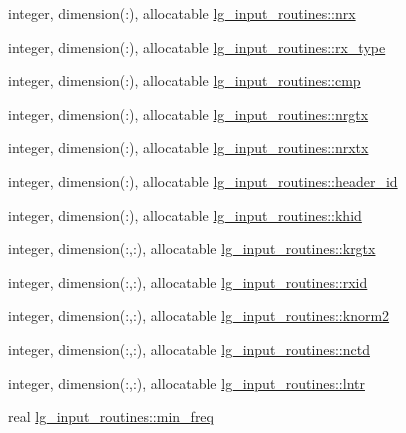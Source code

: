 \begin{DoxyCompactItemize}
\item 
integer, dimension(\+:), allocatable \hyperlink{namespacelg__input__routines_adf5b39741b7d138a3ecfb6657123a5ee}{lg\+\_\+input\+\_\+routines\+::nrx}
\item 
integer, dimension(\+:), allocatable \hyperlink{namespacelg__input__routines_afadcb9ad7dfccd7edb679d19fec0b5db}{lg\+\_\+input\+\_\+routines\+::rx\+\_\+type}
\item 
integer, dimension(\+:), allocatable \hyperlink{namespacelg__input__routines_ae700c1a68129dc3b61dd0eee2253b79f}{lg\+\_\+input\+\_\+routines\+::cmp}
\item 
integer, dimension(\+:), allocatable \hyperlink{namespacelg__input__routines_aa0b46c0970c520713d64c57e4ae00693}{lg\+\_\+input\+\_\+routines\+::nrgtx}
\item 
integer, dimension(\+:), allocatable \hyperlink{namespacelg__input__routines_a7b767c5d80ecdf07e162e0ca88f18f5a}{lg\+\_\+input\+\_\+routines\+::nrxtx}
\item 
integer, dimension(\+:), allocatable \hyperlink{namespacelg__input__routines_a84a9e4845e4cff7e15d920d545e920fe}{lg\+\_\+input\+\_\+routines\+::header\+\_\+id}
\item 
integer, dimension(\+:), allocatable \hyperlink{namespacelg__input__routines_a152f414afe35dd2a3cc3fe4aeb73f16a}{lg\+\_\+input\+\_\+routines\+::khid}
\item 
integer, dimension(\+:,\+:), allocatable \hyperlink{namespacelg__input__routines_a2e7d7acfc8544ee74be5c4653975d59e}{lg\+\_\+input\+\_\+routines\+::krgtx}
\item 
integer, dimension(\+:,\+:), allocatable \hyperlink{namespacelg__input__routines_a33045beebfc96f4327913100eaf5c836}{lg\+\_\+input\+\_\+routines\+::rxid}
\item 
integer, dimension(\+:,\+:), allocatable \hyperlink{namespacelg__input__routines_a1b1ea2c286118a9e13f960c54b61103b}{lg\+\_\+input\+\_\+routines\+::knorm2}
\item 
integer, dimension(\+:,\+:), allocatable \hyperlink{namespacelg__input__routines_a9175b2b25b77757b5b292b6924ace5b8}{lg\+\_\+input\+\_\+routines\+::nctd}
\item 
integer, dimension(\+:,\+:), allocatable \hyperlink{namespacelg__input__routines_aba611144680c51239dc61b36cdba8ce7}{lg\+\_\+input\+\_\+routines\+::lntr}
\item 
real \hyperlink{namespacelg__input__routines_acb44b11a9696ae1c79df024815d346bf}{lg\+\_\+input\+\_\+routines\+::min\+\_\+freq}
\item 

\end{DoxyCompactItemize}
